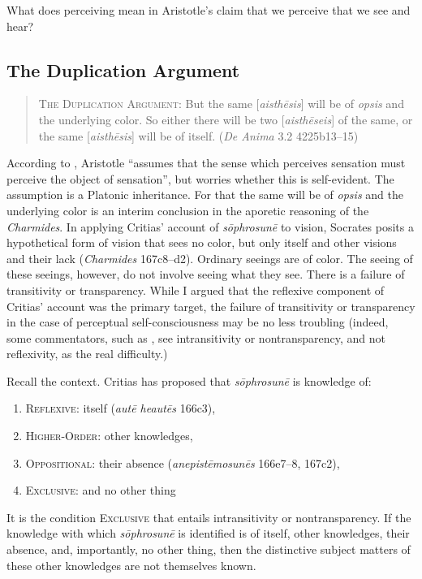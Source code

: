 What does perceiving mean in Aristotle's claim that we perceive that we see and hear? 


\subsection{The Duplication Argument} %
\label{sub:the_duplication_argument}

\begin{quote}
	\textsc{The Duplication Argument}: But the same [\emph{aisthēsis}] will be of \emph{opsis} and the underlying color. So either there will be two [\emph{aisthēseis}] of the same, or the same [\emph{aisthēsis}] will be of itself. (\emph{De Anima} 3.2 4225b13–15)
\end{quote}

According to \citet[435]{Hicks:1907uq}, Aristotle ``assumes that the sense which perceives sensation must perceive the object of sensation'', but worries whether this is self-evident. The assumption is a Platonic inheritance. For that the same will be of \emph{opsis} and the underlying color is an interim conclusion in the aporetic reasoning of the \emph{Charmides}. In applying Critias' account of \emph{sōphrosunē} to vision, Socrates posits a hypothetical form of vision that sees no color, but only itself and other visions and their lack (\emph{Charmides} 167c8–d2). Ordinary seeings are of color. The seeing of these seeings, however, do not involve seeing what they see. There is a failure of transitivity or transparency.  While I argued that the reflexive component of Critias' account was the primary target, the failure of transitivity or transparency in the case of perceptual self-consciousness may be no less troubling (indeed, some commentators, such as \citealt[202–3]{Sorabji:2006aa}, see intransitivity or nontransparency, and not reflexivity, as the real difficulty.)

Recall the context. Critias has proposed that \emph{sōphrosunē} is knowledge of:
\begin{enumerate}[(1)]
	\item \textsc{Reflexive}: itself (\emph{autē heautēs} 166c3),
	\item \textsc{Higher-Order}: other knowledges,
	\item \textsc{Oppositional}: their absence (\emph{anepistēmosunēs} 166e7–8, 167c2),
	\item \textsc{Exclusive}: and no other thing
\end{enumerate}
It is the condition \textsc{Exclusive} that entails intransitivity or nontransparency. If the knowledge with which \emph{sōphrosunē} is identified is of itself, other knowledges, their absence, and, importantly, no other thing, then the distinctive subject matters of these other knowledges are not themselves known. 

